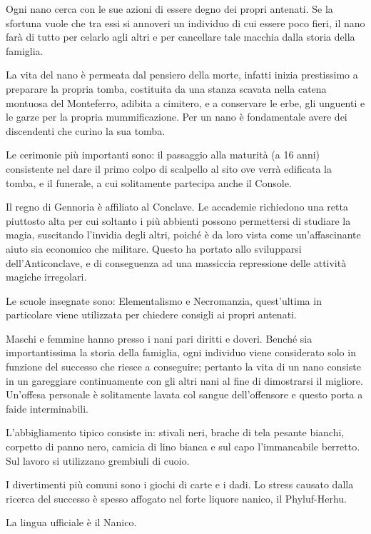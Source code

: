 Ogni nano cerca con
le sue azioni di essere degno dei propri antenati.  Se la sfortuna
vuole che tra essi si annoveri un individuo di cui essere poco fieri,
il nano far\`a di tutto per celarlo agli altri e per cancellare tale
macchia dalla storia della famiglia. 

La vita del nano \`e permeata dal pensiero della morte, infatti inizia
prestissimo a preparare la propria tomba, costituita da una stanza
scavata nella catena montuosa del Monteferro, adibita a cimitero, e a
conservare le erbe, gli unguenti e le garze per la propria
mummificazione. Per un nano \`e fondamentale avere dei discendenti che
curino la sua tomba.

Le cerimonie pi\`u importanti sono: il passaggio alla maturit\`a (a 16
anni) consistente nel dare il primo colpo di scalpello al sito ove
verr\`a edificata la tomba, e il funerale, a cui solitamente partecipa
anche il Console.

\Magia Il regno di Gennoria \`e affiliato al Conclave. Le accademie
richiedono una retta piuttosto alta per cui soltanto i pi\`u abbienti
possono permettersi di studiare la magia, suscitando l'invidia degli
altri, poich\'e \`e da loro vista come un'affascinante aiuto sia
economico che militare.  Questo ha portato allo svilupparsi
dell'Anticonclave, e di conseguenza ad una massiccia repressione delle
attivit\`a magiche irregolari.

Le scuole insegnate sono: Elementalismo e Necromanzia, quest'ultima in
particolare viene utilizzata per chiedere consigli ai propri antenati.

\Moda Maschi e femmine hanno presso i nani pari diritti e doveri.
Bench\'e sia importantissima la storia della famiglia, ogni individuo
viene considerato solo in funzione del successo che riesce a
conseguire; pertanto la vita di un nano consiste in un gareggiare
continuamente con gli altri nani al fine di dimostrarsi il migliore.
Un'offesa personale \`e solitamente lavata col sangue dell'offensore e
questo porta a faide interminabili.  

L'abbigliamento tipico consiste
in: stivali neri, brache di tela pesante bianchi, corpetto di panno
nero, camicia di lino bianca e sul capo l'immancabile berretto. Sul
lavoro si utilizzano grembiuli di cuoio.

  I divertimenti pi\`u comuni
sono i giochi di carte e i dadi. Lo stress causato dalla ricerca del
successo \`e spesso affogato nel forte liquore nanico, il Phyluf-Herhu. 

La lingua ufficiale \`e il Nanico.

